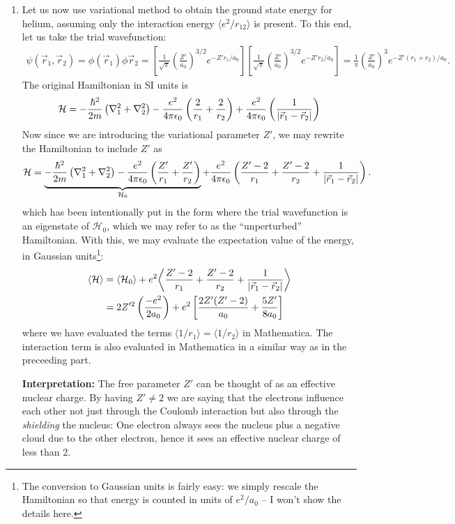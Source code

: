 \documentclass{article}
\theoremstyle{definition}
\newcommand{\ham}{\mathcal{H}}
\newcommand{\f}[2]{\frac{#1}{#2}}
\newcommand{\lp}{\left(}
\newcommand{\rp}{\right)}
\newcommand{\lb}{\left[}
\newcommand{\rb}{\right]}
\begin{document}
\begin{enumerate}[label=(\alph*)]
	\item Let us now use variational method to obtain the ground state energy for helium, assuming only the interaction energy $\langle e^2/r_{12}\rangle$ is present. To this end, let us take the trial wavefunction:
	\begin{align*}
	\psi(\vec{r}_1, \vec{r}_2) = \phi(\vec{r}_1)\phi{\vec{r}_2} = \lb \f{1}{\sqrt{\pi} } \lp \f{Z'}{a_0}\rp^{3/2} e^{-Z'r_1/a_0} \rb \lb \f{1}{\sqrt{\pi} } \lp \f{Z'}{a_0}\rp^{3/2} e^{-Z'r_2/a_0} \rb = \f{1}{\pi}\lp \f{Z'}{a_0} \rp^3 e^{-Z'(r_1 + r_2)/a_0}.
	\end{align*}
	The original Hamiltonian in SI units is 
	\begin{align*}
	\ham = -\f{\hbar^2}{2m}\lp \nabla^2_1 + \nabla_2^2  \rp - \f{e^2}{4\pi \epsilon_0}\lp \f{2}{r_1} + \f{2}{r_2}\rp  +  \f{e^2}{4\pi \epsilon_0}\lp \f{1}{\abs{\vec{r}_1 - \vec{r}_2}}\rp 
	\end{align*}
	Now since we are introducing the variational parameter $Z'$, we may rewrite the Hamiltonian to include $Z'$ as 
	\begin{align*}
	\ham = \underbrace{-\f{\hbar^2}{2m}\lp \nabla^2_1 + \nabla_2^2  \rp - \f{e^2}{4\pi \epsilon_0}\lp \f{Z'}{r_1} + \f{Z'}{r_2}\rp}_{\ham_0}  +  \f{e^2}{4\pi \epsilon_0}\lp \f{Z'-2}{r_1} + \f{Z'-2}{r_2} + \f{1}{\abs{\vec{r}_1 - \vec{r}_2}}\rp.
	\end{align*}
	which has been intentionally put in the form where the trial wavefunction is an eigenstate of $\ham_0$, which we may refer to as the ``unperturbed'' Hamiltonian. With this, we may evaluate the expectation value of the energy, in Gaussian units\footnote{The conversion to Gaussian units is fairly easy: we simply rescale the Hamiltonian so that energy is counted in units of $e^2/a_0$ -- I won't show the details here.}:
	\begin{align*}
	\langle \ham \rangle 
	&= \langle \ham_0 \rangle + e^2 \bigg\langle \f{Z'-2}{r_1} + \f{Z'-2}{r_2} + \f{1}{\abs{\vec{r}_1 - \vec{r}_2}} \bigg\rangle \\
	&= 2Z'^2 \lp \f{-e^2}{2a_0} \rp + e^2 \lb \f{2Z'(Z'-2)}{a_0} + \f{5Z'}{8a_0}  \rb
	\end{align*} 
	where we have evaluated the terms $\langle 1/r_1\rangle = \langle 1/r_2\rangle$ in Mathematica. The interaction term is also evaluated in Mathematica in a similar way as in the preceeding part. 
	
	
	\textbf{Interpretation:} The free parameter $Z'$ can be thought of as an effective nuclear charge. By having $Z'\neq 2$ we are saying that the electrons influence each other not just through the Coulomb interaction but also through the \textit{shielding} the nucleus: One electron always sees the nucleus plus a negative cloud due to the other electron, hence it sees an effective nuclear charge of less than 2. 
	

\end{enumerate}
\end{document}
